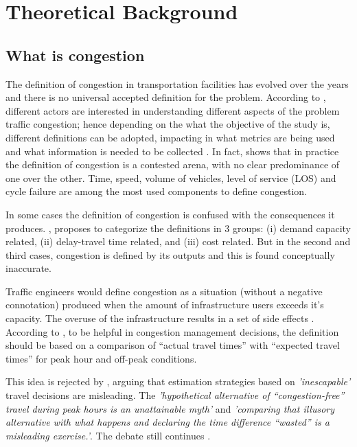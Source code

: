 \documentclass[a4paper]{jpconf}
\begin{document}
	
	\section{Theoretical Background} %
	
	\subsection{What is congestion}
	The definition of congestion in transportation facilities has evolved over the years \parencite{Falcocchio2015} and there is no universal accepted definition for the problem. According to \textcite{Lomax1997}, different actors are interested in understanding different aspects of the problem traffic congestion; hence depending on the what the objective of the study is, different definitions can be adopted, impacting in what metrics are being used and what information is needed to be collected \parencite{Aftabuzzaman2007}. In fact, \textcite{Bertini2005} shows that in practice the definition of congestion is a contested arena, with no clear predominance of one over the other. Time, speed, volume of vehicles, level of service (LOS) and cycle failure are among the most used components to define congestion. \par
	In some cases the definition of congestion is confused with the consequences it produces. \textcite{Aftabuzzaman2007}, proposes to categorize the definitions in 3 groups: (i) demand capacity related, (ii) delay-travel time related, and (iii) cost related. But in the second and third cases, congestion is defined by its outputs and this is found conceptually inaccurate. \par 
	Traffic engineers would define congestion as a situation (without a negative connotation) produced when the amount of infrastructure users exceeds it's capacity. The overuse of the infrastructure results in a set of side effects \parencite{Diakaki2003}. According to \textcite{Falcocchio2015}, 
	to be helpful in congestion management decisions, the definition should be based on a comparison of “actual travel times” with “expected travel times” for peak hour and off-peak conditions. \par
	This idea is rejected by \textcite{Downs1992, JoeCortright2010}, arguing that estimation strategies based on \textit{'inescapable'} travel decisions are  misleading. The \textit{'hypothetical alternative of “congestion-free” travel during peak hours is an unattainable myth'} and \textit{'comparing that illusory alternative with what happens and declaring the time difference “wasted” is a misleading exercise.'}. The debate still continues \parencite{Hamad2002}.\par
\end{document}
